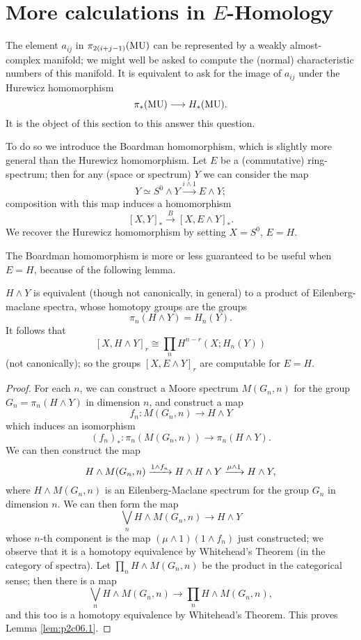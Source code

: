 \documentclass[../main]{subfiles}
\begin{document}
\label{sec:p2c6}
\renewcommand{\labelenumi}{(\roman{enumi})}

\chapter{More calculations in $E$-Homology}
The element $a_{ij}$ in $\pi_{2(i+j-1)}(\mathrm{MU})$ can be represented by a weakly almost-complex manifold; we might well be asked to compute the (normal) characteristic numbers of this manifold. It is equivalent to ask for the image of $a_{ij}$ under the Hurewicz homomorphism
\[\pi_\ast(\mathrm{MU})\longrightarrow H_\ast(\mathrm{MU}).\]
It is the object of this section to this answer this question.

To do so we introduce the Boardman homomorphism, which is slightly more general than the Hurewicz homomorphism. Let $E$ be a (commutative) ring-spectrum; then for any (space or spectrum) $Y$ we can consider the map 
\[Y\simeq S^0\wedge Y\overset{i\wedge 1}{\longrightarrow} E\wedge Y;\]
composition with this map induces a homomorphism 
\[[X,Y]_\ast\overset{B}{\longrightarrow}[X,E\wedge Y]_\ast.\]
We recover the Hurewicz homomorphism by setting $X=S^0$, $E=H$. 

The Boardman homomorphism is more or less guaranteed to be useful when $E=H$, because of the following lemma.
\begin{lemma}
\label{lem:p2c06.1}
$H\wedge Y$ is equivalent (though not canonically, in general) to a product of Eilenberg-maclane spectra, whose homotopy groups are the groups
\[\pi_n(H\wedge Y)=H_n(Y).\]
It follows that 
\[[X,H\wedge Y]_r \cong \prod_n H^{n-r}(X;H_n(Y))\]
(not canonically); so the groups $[X,E\wedge Y]_r$ are computable for $E=H$.
\end{lemma}
\begin{proof}
For each $n$, we can construct a Moore spectrum $M(G_n,n)$ for the group $G_n=\pi_n(H\wedge Y)$ in dimension $n$, and construct a map 
\[f_n:M(G_n,n)\longrightarrow H\wedge Y\]
which induces an isomorphism
\[(f_n)_\ast:\pi_n(M(G_n,n))\longrightarrow \pi_n(H\wedge Y).\]
We can then construct the map
\[H\wedge M(G_n,n)\vra{1\wedge f_n} H\wedge H\wedge Y \vra{\mu\wedge 1} H\wedge Y,\]
where $H\wedge M(G_n,n)$ is an Eilenberg-Maclane spectrum for the group $G_n$ in dimension $n$. We can then form the map
\[\bigvee_n H\wedge M(G_n,n)\longrightarrow H\wedge Y\]
whose $n$-th component is the map $(\mu\wedge 1)(1\wedge f_n)$ just constructed; we observe that it is a homotopy equivalence by Whitehead's Theorem (in the category of spectra). Let $\prod_n H\wedge M(G_n,n)$ be the product in the categorical sense; then there is a map 
\[\bigvee_n H\wedge M(G_n,n)\longrightarrow \prod_n H\wedge M(G_n,n),\]
and this too is a homotopy equivalence by Whitehead's Theorem. This proves Lemma \ref{lem:p2c06.1}.
\end{proof}
\end{document}

